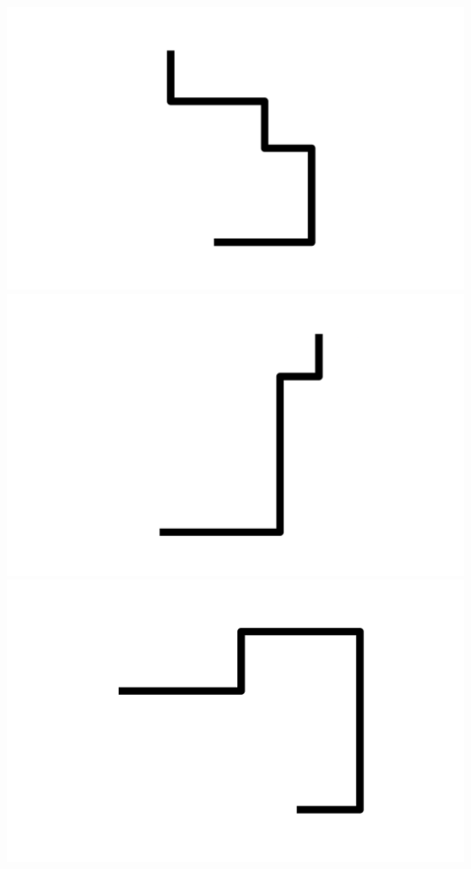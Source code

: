 \documentclass[]{report}
\begin{document}
\includegraphics[scale=.1]{pictures/21/state_cluster_shapes_118.pdf} 
\includegraphics[scale=.1]{pictures/21/state_cluster_shapes_119.pdf} 
\includegraphics[scale=.1]{pictures/21/state_cluster_shapes_120.pdf} 
\end{document}
